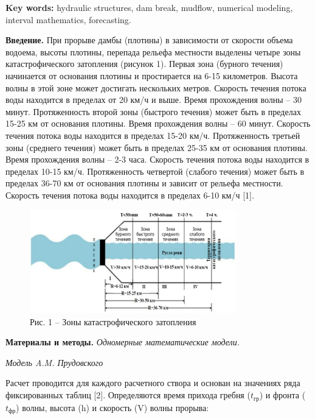 {\bfseries Key words:} hydraulic structures, dam break, mudflow, numerical
modeling, interval mathematics, forecasting.

\begin{multicols}{2}
{\bfseries Введение.} При прорыве дамбы (плотины) в зависимости от скорости
объема водоема, высоты плотины, перепада рельефа местности выделены
четыре зоны катастрофического затопления (рисунок 1). Первая зона
(бурного течения) начинается от основания плотины и простирается на 6-15
километров. Высота волны в этой зоне может достигать нескольких метров.
Скорость течения потока воды находится в пределах от 20 км/ч и выше.
Время прохождения волны -- 30 минут. Протяженность второй зоны (быстрого
течения) может быть в пределах 15-25 км от основания плотины. Время
прохождения волны -- 60 минут. Скорость течения потока воды находится в
пределах 15-20 км/ч. Протяженность третьей зоны (среднего течения) может
быть в пределах 25-35 км от основания плотины. Время прохождения волны
-- 2-3 часа. Скорость течения потока воды находится в пределах 10-15
км/ч. Протяженность четвертой (слабого течения) может быть в пределах
36-70 км от основания плотины и зависит от рельефа местности. Скорость
течения потока воды находится в пределах 6-10 км/ч {[}1{]}.
\end{multicols}

\begin{figure}[H]
	\centering
	\includegraphics[width=0.8\textwidth]{assets/61}
	\caption*{Рис. 1 -- Зоны катастрофического затопления}
\end{figure}

{\bfseries Материалы и методы.} \emph{Одномерные математические модели.}

\emph{Модель A.M. Прудовского}

Расчет проводится для каждого расчетного створа и основан на значениях
ряда фиксированных таблиц {[}2{]}. Определяются время прихода гребня
(\(t_{гр}\)) и фронта (\(t_{фр}\)) волны, высота (h) и скорость (V)
волны прорыва:

